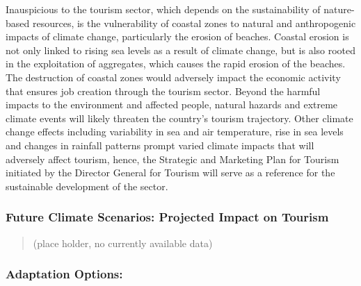 \documentclass[
]{book}
\begin{document}
Inauspicious to the tourism sector, which depends on the sustainability of nature-based resources, is the vulnerability of coastal zones to natural and anthropogenic impacts of climate change, particularly the erosion of beaches. Coastal erosion is not only linked to rising sea levels as a result of climate change, but is also rooted in the exploitation of aggregates, which causes the rapid erosion of the beaches. The destruction of coastal zones would adversely impact the economic activity that ensures job creation through the tourism sector. Beyond the harmful impacts to the environment and affected people, natural hazards and extreme climate events will likely threaten the country's tourism trajectory. Other climate change effects including variability in sea and air temperature, rise in sea levels and changes in rainfall patterns prompt varied climate impacts that will adversely affect tourism, hence, the Strategic and Marketing Plan for Tourism initiated by the Director General for Tourism will serve as a reference for the sustainable development of the sector.

\hypertarget{future-climate-scenarios-projected-impact-on-tourism-1}{%
\subsubsection{Future Climate Scenarios: Projected Impact on Tourism}\label{future-climate-scenarios-projected-impact-on-tourism-1}}

\begin{quote}
(place holder, no currently available data)
\end{quote}

\hypertarget{adaptation-options-12}{%
\subsubsection{Adaptation Options:}\label{adaptation-options-12}}
\end{document}
